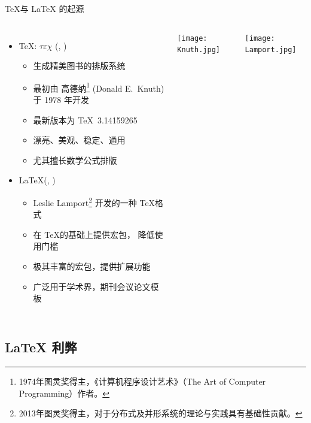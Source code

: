 \begin{frame}[fragile]{\TeX 与 \LaTeX{} 的起源}
  \begin{columns}[T]
    \begin{itemize}
      \item \TeX: $\tau\varepsilon\chi$ (,
        )
        \begin{itemize}
          \item 生成精美图书的排版系统
          \item 最初由 高德纳\footnote{1974年图灵奖得主，《计算机程序设计艺术》（The Art of Computer Programming）作者。} (Donald E.~Knuth) 于 1978 年开发  
          \item 最新版本为 \TeX\ 3.14159265
          \item 漂亮、美观、稳定、通用
          \item 尤其擅长数学公式排版
        \end{itemize}

        \vspace{2em}
      \item \LaTeX{}(, )
        \begin{itemize}
          \item Leslie Lamport\footnote{2013年图灵奖得主，对于分布式及并形系统的理论与实践具有基础性贡献。} 开发的一种 \TeX 格式
          \item 在 \TeX 的基础上提供宏包， 降低使用门槛
          \item 极其丰富的宏包，提供扩展功能
          \item 广泛用于学术界，期刊会议论文模板
        \end{itemize}
    \end{itemize}
    \vspace*{-5mm}
    \hspace{-10mm} \texttt{[image: Knuth.jpg]}

    \hspace{-10mm} \texttt{[image: Lamport.jpg]}

  \end{columns}
\end{frame}

\subsection{\LaTeX{} 利弊}

